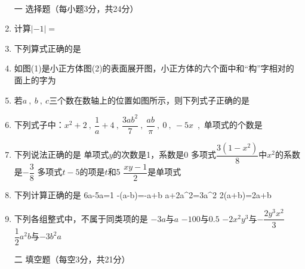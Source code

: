 ﻿\documentclass[11pt,twoside]{ctexart}
\begin{document}
%
%
\begin{center}\bs{}

\\
{\kaishu{}}
\end{center}

\zongfenlana

%
%
\begin{enumerate}
\item[\kaishu{}一]{\kaishu{}\dafenlan{}选择题（每小题3分，共24分）}%
\item 计算$|-1|=$

\item 下列算式正确的是

\item 如图(1)是小正方体图(2)的表面展开图，小正方体的六个面中和“构”字相对的面上的字为


\item 若$a~,~b~,~c$三个数在数轴上的位置如图所示，则下列式子正确的是


\item 下列式子中：$x^2+2~,~\dfrac{1}{a}+4~,~\dfrac{3ab^2}{7}~,~\dfrac{ab}{\pi}~,~0~,~-5x$~,~单项式的个数是
\item 下列说法正确的是
\xx
{单项式$y$的次数是1，系数是0}
{多项式$\dfrac{3(1-x^2)}{8}$中$x^2$的系数是$-\dfrac{3}{8}$}
{多项式$t-5$的项是$t$和5}
{$\dfrac{xy-1}{2}$是单项式}
\item 下列计算正确的是
\xxs
{6a-5a=1}
{-(a-b)=-a+b}
{a+2a^2=3a^2}
{2(a+b)=2a+b}
\item 下列各组整式中，不属于同类项的是
\xx
{$-3a$与$a$}
{$-100$与$0.5$}
{$-2x^2y^3$与$-\dfrac{2y^3x^2}{3}$}
{$\dfrac{1}{2}a^2b$与$-3b^2a$}

\item[\kaishu{}二]{\kaishu{}\dafenlan{}填空题（每空3分，共21分）}%


\end{enumerate}
\end{document}
